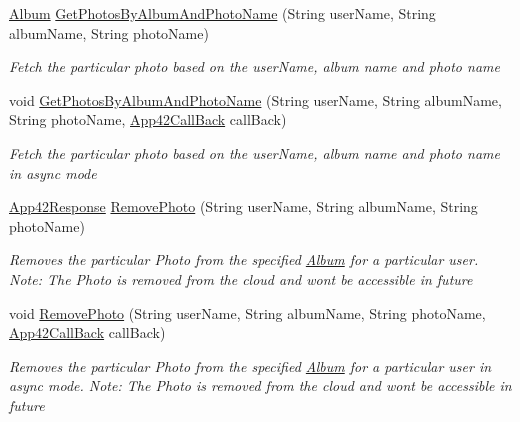 \begin{DoxyCompactItemize}
\item 
\hyperlink{classcom_1_1shephertz_1_1app42_1_1paas_1_1sdk_1_1csharp_1_1gallery_1_1_album}{Album} \hyperlink{classcom_1_1shephertz_1_1app42_1_1paas_1_1sdk_1_1csharp_1_1gallery_1_1_photo_service_a8ec620a09084ebe7250aa660018a17db}{Get\+Photos\+By\+Album\+And\+Photo\+Name} (String user\+Name, String album\+Name, String photo\+Name)
\begin{DoxyCompactList}\small\item\em Fetch the particular photo based on the user\+Name, album name and photo name \end{DoxyCompactList}\item 
void \hyperlink{classcom_1_1shephertz_1_1app42_1_1paas_1_1sdk_1_1csharp_1_1gallery_1_1_photo_service_a1d54faa385e7a66b70afc114cbe326d1}{Get\+Photos\+By\+Album\+And\+Photo\+Name} (String user\+Name, String album\+Name, String photo\+Name, \hyperlink{interfacecom_1_1shephertz_1_1app42_1_1paas_1_1sdk_1_1csharp_1_1_app42_call_back}{App42\+Call\+Back} call\+Back)
\begin{DoxyCompactList}\small\item\em Fetch the particular photo based on the user\+Name, album name and photo name in async mode \end{DoxyCompactList}\item 
\hyperlink{classcom_1_1shephertz_1_1app42_1_1paas_1_1sdk_1_1csharp_1_1_app42_response}{App42\+Response} \hyperlink{classcom_1_1shephertz_1_1app42_1_1paas_1_1sdk_1_1csharp_1_1gallery_1_1_photo_service_a2b77ed5429f6cdf6ce5a5f1f78409e29}{Remove\+Photo} (String user\+Name, String album\+Name, String photo\+Name)
\begin{DoxyCompactList}\small\item\em Removes the particular Photo from the specified \hyperlink{classcom_1_1shephertz_1_1app42_1_1paas_1_1sdk_1_1csharp_1_1gallery_1_1_album}{Album} for a particular user. Note\+: The Photo is removed from the cloud and wont be accessible in future \end{DoxyCompactList}\item 
void \hyperlink{classcom_1_1shephertz_1_1app42_1_1paas_1_1sdk_1_1csharp_1_1gallery_1_1_photo_service_a066f99ae3b50d3909f4c87c622ffa7ee}{Remove\+Photo} (String user\+Name, String album\+Name, String photo\+Name, \hyperlink{interfacecom_1_1shephertz_1_1app42_1_1paas_1_1sdk_1_1csharp_1_1_app42_call_back}{App42\+Call\+Back} call\+Back)
\begin{DoxyCompactList}\small\item\em Removes the particular Photo from the specified \hyperlink{classcom_1_1shephertz_1_1app42_1_1paas_1_1sdk_1_1csharp_1_1gallery_1_1_album}{Album} for a particular user in async mode. Note\+: The Photo is removed from the cloud and wont be accessible in future \end{DoxyCompactList}\item 

\end{DoxyCompactItemize}
